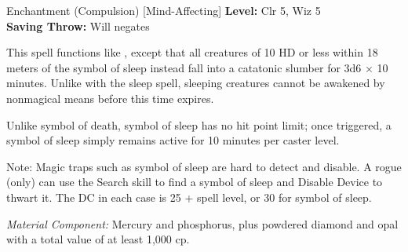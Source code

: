 {Enchantment (Compulsion) [Mind-Affecting]}
{
	\textbf{Level:}
	Clr 5, Wiz 5\\
	\textbf{Saving Throw:}
	Will negates\\
}
{
	This spell functions like , except that all creatures of 10 HD or less within 18 meters of the symbol of sleep instead fall into a catatonic slumber for 3d6 $\times$ 10 minutes. Unlike with the sleep spell, sleeping creatures cannot be awakened by nonmagical means before this time expires.

	Unlike symbol of death, symbol of sleep has no hit point limit; once triggered, a symbol of sleep simply remains active for 10 minutes per caster level.

	Note: Magic traps such as symbol of sleep are hard to detect and disable. A rogue (only) can use the Search skill to find a symbol of sleep and Disable Device to thwart it. The DC in each case is 25 + spell level, or 30 for symbol of sleep.

	\textit{Material Component:}
	Mercury and phosphorus, plus powdered diamond and opal with a total value of at least 1,000 cp.

}
